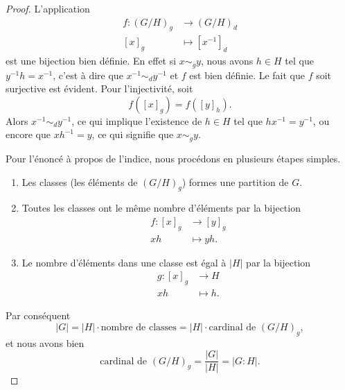 \begin{proof}
    L'application
    \begin{equation}
        \begin{aligned}
            f\colon (G/H)_g&\to (G/H)_d \\
            [x]_g&\mapsto [x^{-1}]_d 
        \end{aligned}
    \end{equation}
    est une bijection bien définie. En effet si \( x\sim_g y\), nous avons \( h\in H\) tel que \( y^{-1}h=x^{-1}\), c'est à dire que \( x^{-1}\sim_d y^{-1}\) et \( f\) est bien définie. Le fait que \( f\) soit surjective est évident. Pour l'injectivité, soit
    \begin{equation}
        f([x]_g)=f([y]_h).
    \end{equation}
    Alors \( x^{-1}\sim_d y^{-1}\), ce qui implique l'existence de \( h\in H\) tel que \( hx^{-1}=y^{-1}\), ou encore que \( xh^{-1}=y\), ce qui signifie que \( x\sim_gy\).

    Pour l'énoncé à propos de l'indice, nous procédons en plusieurs étapes simples.
    \begin{enumerate}
        \item
            Les classes (les éléments de \( (G/H)_g\)) formes une partition de $G$.
        \item
            Toutes les classes ont le même nombre d'éléments par la bijection 
            \begin{equation}
                \begin{aligned}
                    f\colon [x]_g&\to [y]_g \\
                    xh&\mapsto yh. 
                \end{aligned}
            \end{equation}
        \item
            Le nombre d'éléments dans une classe est égal à \( | H |\) par la bijection
            \begin{equation}
                \begin{aligned}
                    g\colon [x]_g&\to H \\
                    xh&\mapsto h. 
                \end{aligned}
            \end{equation}
    \end{enumerate}
    Par conséquent
    \begin{equation}
        | G |=| H |\cdot \text{nombre de classes}=| H |\cdot\text{cardinal de $(G/H)_g$},
    \end{equation}
    et nous avons bien 
    \begin{equation}
        \text{cardinal de }(G/H)_g=\frac{ | G | }{ | H | }=| G:H |.
    \end{equation}
\end{proof}

